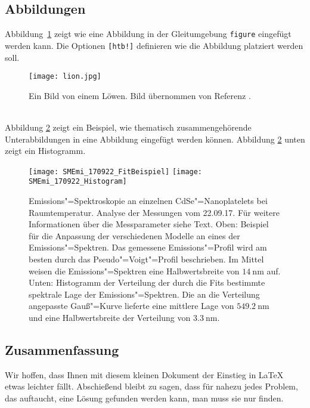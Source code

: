 \subsection{Abbildungen}
\label{subsec:Abb}
Abbildung~\ref{fig:figureone} zeigt wie eine Abbildung in der Gleitumgebung \verb"figure" eingefügt werden kann. Die Optionen \verb"[htb!]" definieren wie die Abbildung platziert werden soll.
\begin{figure}[htb!]
 \centering
 \texttt{[image: lion.jpg]}
 \caption{\label{fig:figureone}  Ein Bild von einem Löwen. Bild übernommen von Referenz \cite{Internetbildquelle}.}
\end{figure}\\
%
Abbildung \ref{fig:vieleBilder} zeigt ein Beispiel, wie thematisch zusammengehörende Unterabbildungen in eine Abbildung eingefügt werden können. Abbildung \ref{fig:vieleBilder} unten zeigt ein Histogramm. 
%
\begin{figure}[h!tb]
\centering
  \texttt{[image: SMEmi\_170922\_FitBeispiel]}
\hfill
  \texttt{[image: SMEmi\_170922\_Histogram]}
\caption{Emissions"=Spektroskopie an einzelnen CdSe"=Nanoplatelets bei Raumtemperatur. Analyse der Messungen vom 22.09.17. Für weitere Informationen über die Messparameter siehe Text. Oben: Beispiel für die Anpassung der verschiedenen Modelle an eines der Emissions"=Spektren. Das gemessene Emissions"=Profil wird am besten durch das Pseudo"=Voigt"=Profil beschrieben. Im Mittel weisen die Emissions"=Spektren eine Halbwertsbreite von $\SI{14}{\nano\meter}$ auf. Unten: Histogramm der Verteilung der durch die Fits bestimmte spektrale Lage der Emissions"=Spektren. Die an die Verteilung angepasste Gauß"=Kurve lieferte eine mittlere Lage von $\SI{549,2}{\nano\meter}$ und eine Halbwertsbreite der Verteilung von $\SI{3,3}{\nano\meter}$.}
\label{fig:vieleBilder}
\end{figure}
\newline
\FloatBarrier
%
\subsection{Zusammenfassung}
\label{subsec:ZusammenLatex}
%
Wir hoffen, dass Ihnen mit diesem kleinen Dokument der Einstieg in \LaTeX{} etwas leichter fällt. Abschießend bleibt zu sagen, dass für nahezu jedes Problem, das auftaucht, eine Lösung gefunden werden kann, man muss sie nur finden.